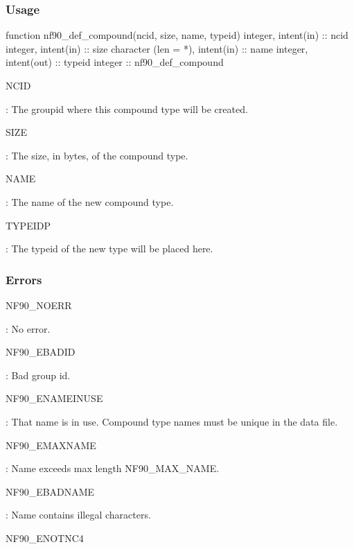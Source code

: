 \subsubsection*{Usage}


\begin{DoxyCode}
\textcolor{keyword}{function }nf90\_def\_compound(ncid, size, name, typeid)
  \textcolor{keywordtype}{integer}, \textcolor{keywordtype}{intent(in)} :: ncid
  \textcolor{keywordtype}{integer}, \textcolor{keywordtype}{intent(in)} :: size
  \textcolor{keywordtype}{character (len = *)}, \textcolor{keywordtype}{intent(in)} :: name
  \textcolor{keywordtype}{integer}, \textcolor{keywordtype}{intent(out)} :: typeid
  \textcolor{keywordtype}{integer} :: nf90\_def\_compound
\end{DoxyCode}


{\ttfamily N\+C\+ID}

\+: The groupid where this compound type will be created.

{\ttfamily S\+I\+ZE}

\+: The size, in bytes, of the compound type.

{\ttfamily N\+A\+ME}

\+: The name of the new compound type.

{\ttfamily T\+Y\+P\+E\+I\+DP}

\+: The typeid of the new type will be placed here.

\subsubsection*{Errors}

{\ttfamily N\+F90\+\_\+\+N\+O\+E\+RR}

\+: No error.

{\ttfamily N\+F90\+\_\+\+E\+B\+A\+D\+ID}

\+: Bad group id.

{\ttfamily N\+F90\+\_\+\+E\+N\+A\+M\+E\+I\+N\+U\+SE}

\+: That name is in use. Compound type names must be unique in the data file.

{\ttfamily N\+F90\+\_\+\+E\+M\+A\+X\+N\+A\+ME}

\+: Name exceeds max length N\+F90\+\_\+\+M\+A\+X\+\_\+\+N\+A\+ME.

{\ttfamily N\+F90\+\_\+\+E\+B\+A\+D\+N\+A\+ME}

\+: Name contains illegal characters.

{\ttfamily N\+F90\+\_\+\+E\+N\+O\+T\+N\+C4}

